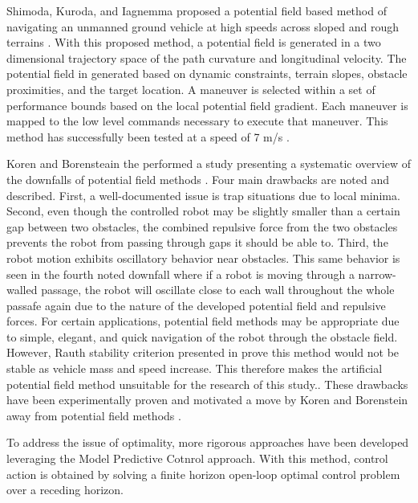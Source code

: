 \documentclass[12pt,onecolumn]{article}
\begin{document}
Shimoda, Kuroda, and Iagnemma proposed a potential field based method of navigating an unmanned ground vehicle at high speeds across sloped and rough terrains \cite{Shimoda&Kuroda&Iagnemma2007}. With this proposed method, a potential field is generated in a two dimensional trajectory space of the path curvature and longitudinal velocity. The potential field in generated based on dynamic constraints, terrain slopes, obstacle proximities, and the target location. A maneuver is selected within a set of performance bounds based on the local potential field gradient. Each maneuver is mapped to the low level commands necessary to execute that maneuver. This method has successfully been tested at a speed of 7 m/s \cite{Shimoda&Kuroda&Iagnemma2007}.

Koren and Borensteain the performed a study presenting a systematic overview of the downfalls of potential field methods \cite{Koren&Borenstein1991}. Four main drawbacks are noted and described. First, a well-documented issue is trap situations due to local minima. Second, even though the controlled robot may be slightly smaller than a certain gap between two obstacles, the combined repulsive force from the two obstacles prevents the robot from passing through gaps it should be able to. Third, the robot motion exhibits oscillatory behavior near obstacles. This same behavior is seen in the fourth noted downfall where if a robot is moving through a narrow-walled passage, the robot will oscillate close to each wall throughout the whole passafe again due to the nature of the developed potential field and repulsive forces. For certain applications, potential field methods may be appropriate due to simple, elegant, and quick navigation of the robot through the obstacle field. However, Rauth stability criterion presented in \cite{Koren&Borenstein1991} prove this method would not be stable as vehicle mass and speed increase. This therefore makes the artificial potential field method unsuitable for the research of this study.. These drawbacks have been experimentally proven and motivated a move by Koren and Borenstein away from potential field methods \cite{Koren&Borenstein1991}.

To address the issue of optimality, more rigorous approaches have been developed leveraging the Model Predictive Cotnrol approach. With this method, control action is obtained by solving a finite horizon open-loop optimal control problem over a receding horizon.
\end{document}
